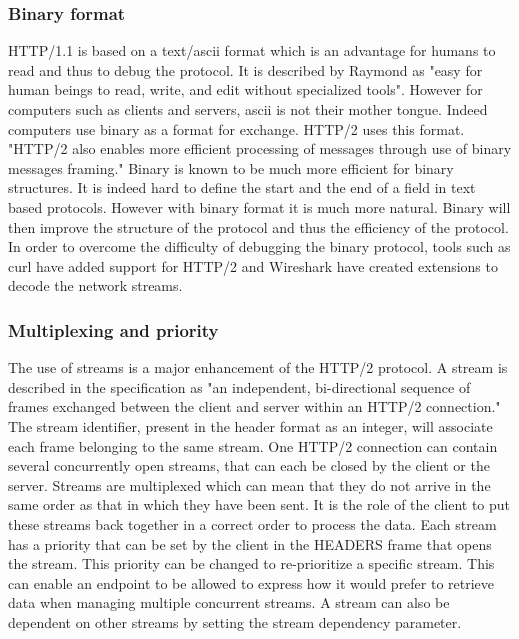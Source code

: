 \subsubsection{Binary format}
HTTP/1.1 is based on a text/ascii format which is an advantage for humans to read and thus to debug the protocol. It is described by Raymond as "easy for human beings to read, write, and edit without specialized tools"\cite{raymond}. However for computers such as clients and servers, ascii is not their mother tongue. Indeed computers use binary as a format for exchange. HTTP/2 uses this format.
"HTTP/2 also enables more efficient processing of messages through use of binary messages framing."\cite{http2} Binary is known to be much more efficient for binary structures. It is indeed hard to define the start and the end of a field in text based protocols. However with binary format it is much more natural. Binary will then improve the structure of the protocol and thus the efficiency of the protocol. In order to overcome the difficulty of debugging the binary protocol, tools such as curl\cite{curlhttp2} have added support for HTTP/2 and Wireshark have created extensions\cite{wiresharkhttp2} to decode the network streams.

\subsubsection{Multiplexing and priority}
The use of streams is a major enhancement of the HTTP/2 protocol. A stream is described in the specification as "an independent, bi-directional sequence of frames exchanged between the client and server within an HTTP/2 connection."\cite{http2} The stream identifier, present in the header format as an integer, will associate each frame belonging to the same stream. One HTTP/2 connection can contain several concurrently open streams, that can each be closed by the client or the server. Streams are multiplexed which can mean that they do not arrive in the same order as that in which they have been sent. It is the role of the client to put these streams back together in a correct order to process the data. 
Each stream has a priority that can be set by the client in the HEADERS frame that opens the stream. This priority can be changed to re-prioritize a specific stream. This can enable an endpoint to be allowed to express how it would prefer to retrieve data when managing multiple concurrent streams. A stream can also be dependent on other streams by setting the stream dependency parameter.

